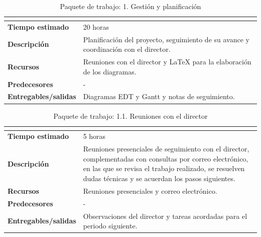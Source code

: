 \documentclass[11pt, a4paper]{report}
\begin{document}
	\begin{table}[H]
		\centering
		\begin{tabularx}{\linewidth}{|>{\bfseries}l|X|}
			\hline
			\rowcolor{pkg-gestion}
			\multicolumn{2}{|c|}{\textcolor{white}{\textbf{1. Gestión y planificación}}} \\
			\hline
			Tiempo estimado & 20 horas \\
			\hline
			\rowcolor{fila-alterna}
			Descripción & Planificación del proyecto, seguimiento de su avance y coordinación con el director. \\
			\hline
			Recursos & Reuniones con el director y LaTeX para la elaboración de los diagramas. \\
			\hline
			\rowcolor{fila-alterna}
			Predecesores & - \\
			\hline
			Entregables/salidas & Diagramas EDT y Gantt y notas de seguimiento. \\
			\hline
		\end{tabularx}
		\caption{Paquete de trabajo: 1. Gestión y planificación}
		\label{tab:pkg-gestion}
	\end{table}

	\begin{table}[H]
		\centering
		\begin{tabularx}{\linewidth}{|>{\bfseries}l|X|}
			\hline
			\rowcolor{pkg-gestion}
			\multicolumn{2}{|c|}{\textcolor{white}{\textbf{1.1. Reuniones con el director}}} \\
			\hline
			Tiempo estimado & 5 horas \\
			\hline
			\rowcolor{fila-alterna}
			Descripción & Reuniones presenciales de seguimiento con el director, complementadas con consultas por correo electrónico, en las que se revisa el trabajo realizado, se resuelven dudas técnicas y se acuerdan los pasos siguientes. \\
			\hline
			Recursos & Reuniones presenciales y correo electrónico. \\
			\hline
			\rowcolor{fila-alterna}
			Predecesores & - \\
			\hline
			Entregables/salidas & Observaciones del director y tareas acordadas para el periodo siguiente. \\
			\hline
		\end{tabularx}
		\caption{Paquete de trabajo: 1.1. Reuniones con el director}
		\label{tab:pkg-reuniones}
	\end{table}
\end{document}
